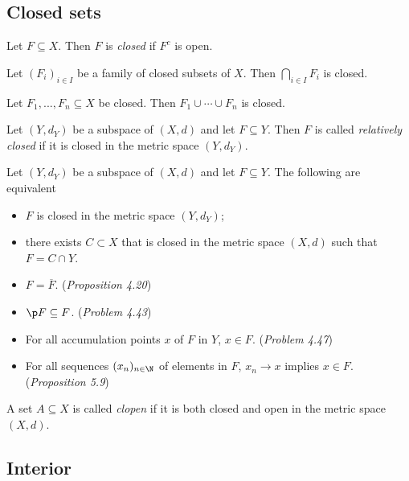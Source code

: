 \documentclass{article}
\begin{document}
\subsection{Closed sets}

\begin{definition}
	Let $F\subseteq X$. Then $F$ is \emph{closed} if $F^c$ is open.
\end{definition}

\begin{theorem}[4.20]
	Let $(F_i)_{i\in I}$ be a family of closed subsets of $X$. Then $\bigcap_{i\in I}F_i$
	is closed.
\end{theorem}

\begin{theorem}[4.21]
	Let $F_1,...,F_n\subseteq X$ be closed. Then $F_1\cup\cdots\cup F_n$ is closed.
\end{theorem}

\begin{definition}
	Let $(Y,d_Y)$ be a subspace of $(X,d)$ and let $F\subseteq Y$. Then $F$ is called
	\emph{relatively closed} if it is closed in the metric space $(Y,d_Y)$.
\end{definition}

\begin{proposition}
	Let $(Y,d_Y)$ be a subspace of $(X,d)$ and let $F\subseteq Y$. The following are
	equivalent
	\begin{itemize}
		\item $F$ is closed in the metric space $(Y,d_Y)$;
		\item there exists $C\subset X$ that is closed in the metric space $(X,d)$ such that
		      $F=C\cap Y$.
		\item $F=\overline F$. (\emph{Proposition 4.20})
		\item $\p F\subseteq F$. (\emph{Problem 4.43})
		\item For all accumulation points $x$ of $F$ in $Y$, $x\in F$. (\emph{Problem 4.47})
		\item For all sequences $(x_n)_{n\in\N}$ of elements in $F$, $x_n\to x$ implies $x\in F$. (\emph{Proposition 5.9})
	\end{itemize}
\end{proposition}

\begin{definition}
	A set $A\subseteq X$ is called \emph{clopen} if it is both closed and open
	in the metric space $(X,d)$.
\end{definition}

\subsection{Interior}
\end{document}
